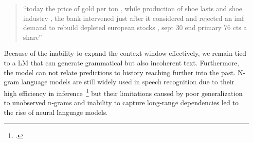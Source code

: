 \begin{quote}
“today the price of gold per ton , while production of shoe lasts and shoe industry , the bank intervened just after it considered and rejected an imf demand to rebuild depleted european stocks , sept 30 end primary 76 cts a share”
\end{quote}

Because of the inability to expand the context window effectively, we remain tied to a LM that can generate grammatical but also incoherent text. Furthermore, the model can not relate predictions to history reaching further into the past. N-gram language models are still widely used in speech recognition due to their high efficiency in inference~\footcite{wang2019improving} but their limitations caused by poor generalization to unobserved n-grams and inability to capture long-range dependencies led to the rise of neural language models.




